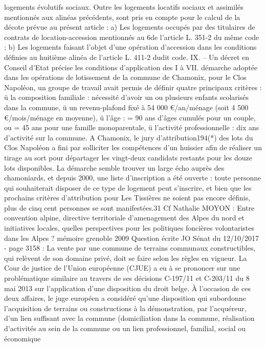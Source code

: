 \documentclass[11pt,a4paper]{report}
\begin{document}
	logements évolutifs sociaux.
	Outre les logements locatifs sociaux et assimilés mentionnés aux alinéas précédents, sont pris en compte pour le
	calcul de la décote prévue au présent article :
	a) Les logements occupés par des titulaires de contrats de location-accession mentionnés au 6\degre  de l'article L.
	351-2 du même code ;
	b) Les logements faisant l'objet d'une opération d'accession dans les conditions définies au huitième alinéa de
	l'article L. 411-2 dudit code.
	IX. – Un décret en Conseil d'Etat précise les conditions d'application des I à VII.
	démarche adoptée dans les opérations de lotissement de la commune de Chamonix, pour le Clos Napoléon,
	un groupe de travail avait permis de définir quatre principaux critères :
	ü la composition familiale : nécessité d'avoir un ou plusieurs enfants scolarisés dans la commune,
	ü un revenu-plafond fixé à 54 000 \euro /an/ménage (soit 4 500 \euro /mois/ménage en moyenne),
	ü l'âge : = 90 ans d'âges cumulés pour un couple, ou = 45 ans pour une famille monoparentale,
	ü l'activité professionnelle : dix ans d'activité sur la commune.
	A Chamonix, le jury d'attribution194(*) des lots du Clos Napoléon a fini par solliciter les compétences d'un
	huissier afin de réaliser un tirage au sort pour départager les vingt-deux candidats restants pour les douze lots
	disponibles. La démarche semble trouver un large écho auprès des chamoniards, et depuis 2000, une liste
	d'inscription a été ouverte : toute personne qui souhaiterait disposer de ce type de logement peut s'inscrire, et
	bien que les prochains critères d'attribution pour Les Tissières ne soient pas encore définis, plus de cinq cent
	personnes se sont manifestées.31
	Cf Nathalie MOYON : Entre convention alpine, directive territoriale d'amenagement des Alpes du nord et
	initiatives locales, quelles perspectives pour les politiques foncières volontaristes dans les Alpes ? mémoire
	grenoble 2009
	Question écrite  JO Sénat du 12/10/2017 - page 3158 : La vente par une commune de terrains
	communaux constructibles, qui relèvent de son domaine privé, doit se faire selon les règles en vigueur. La Cour
	de justice de l'Union européenne (CJUE) a eu à se prononcer sur une problématique similaire au travers de ses
	décisions C-197/11 et C-203/11 du 8 mai 2013 sur l'application d'une disposition du droit belge. À l'occasion de
	ces deux affaires, le juge européen a considéré qu'une disposition qui subordonne l'acquisition de terrains ou
	constructions à la démonstration, par l'acquéreur, d'un lien suffisant avec la commune (domiciliation dans la
	commune, réalisation d'activités au sein de la commune ou un lien professionnel, familial, social ou économique
\end{document}
